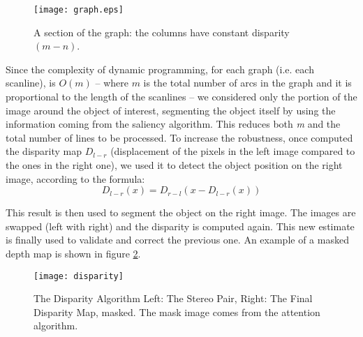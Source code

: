 \begin{figure}
	\centering
		\texttt{[image: graph.eps]}
	\caption{A section of the graph: the columns have constant disparity $(m-n)$.}
	\label{fig-graph}
\end{figure}

Since the complexity of dynamic programming, for each graph (i.e. each scanline), is $O(m)$ -- where $m$ is the total number of arcs in the graph and it is proportional to the length of the scanlines -- we considered only the portion of the image around the object of interest, segmenting the object itself by using the information coming from the saliency algorithm. This reduces both {\em m} and the total number of lines to be processed. To increase the robustness, once computed the disparity map $D_{l-r}$ (displacement of the pixels in the left image compared to the ones in the right one), we used it to detect the object position on the right image, according to the formula: 
\begin{equation}D_{l-r}(x)=D_{r-l}(x-D_{l-r}(x))\end{equation}

This result is then used to segment the object on the right image. The images are swapped (left with right) and the disparity is computed again. This new estimate is finally used to validate and correct the previous one. An example of a masked depth map is shown in figure \ref{fig-disparity}.

\begin{figure}
\centering
\texttt{[image: disparity]}
\caption{The Disparity Algorithm  Left: The Stereo Pair, Right: The Final Disparity Map, masked. The mask image comes from the attention algorithm.}
\label{fig-disparity}
\end{figure}

